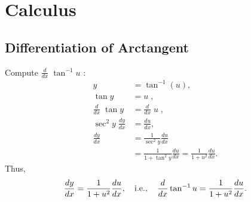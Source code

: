 \documentclass[11pt,openany]{article}
\begin{document}
%
%		
%		
%		
%		
%


\newpage
\appendix
\section{Calculus}
\subsection{Differentiation of Arctangent}
Compute $\displaystyle\frac{d}{dx}\; \tan^{-1}u$\; : \begin{align*}
	y&=\tan^{-1}(u),\\
	\tan y&= u\;,\\
	\frac{d}{dx}\; \tan y&=\frac{d}{dx}\;  u\;, \\
	\sec^2 y\; \frac{dy}{dx}&=\frac{du}{dx},\\
	\frac{dy}{dx}&=\frac{1}{\sec^2 y}\frac{du}{dx}\\
	&=\frac{1}{1+\tan^2 y}\frac{du}{dx}=\frac{1}{1+u^2}\frac{du}{dx}.
\end{align*} Thus, \[
\frac{dy}{dx}=\frac{1}{1+u^2}\frac{du}{dx},\quad\textnormal{i.e.},\quad \frac{d}{dx}\tan^{-1}u=\frac{1}{1+u^2}\frac{du}{dx}.
\]
\vfill
\end{document}
